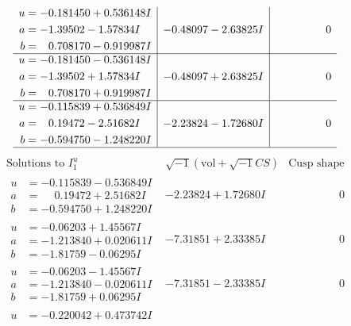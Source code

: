 \documentclass[1p]{elsarticle_modified}
\theoremstyle{definition}
\newcommand{\I}{\sqrt{-1}}
\begin{document}
$$\begin{array}{c|c|c}
\begin{aligned}
u &= -0.181450 + 0.536148 I \\
a &= -1.39502 - 1.57834 I \\
b &= \phantom{-}0.708170 - 0.919987 I\end{aligned}
 & -0.48097 - 2.63825 I & \phantom{-0.000000 } 0 \\ \hline\begin{aligned}
u &= -0.181450 - 0.536148 I \\
a &= -1.39502 + 1.57834 I \\
b &= \phantom{-}0.708170 + 0.919987 I\end{aligned}
 & -0.48097 + 2.63825 I & \phantom{-0.000000 } 0 \\ \hline\begin{aligned}
u &= -0.115839 + 0.536849 I \\
a &= \phantom{-}0.19472 - 2.51682 I \\
b &= -0.594750 - 1.248220 I\end{aligned}
 & -2.23824 - 1.72680 I & \phantom{-0.000000 } 0\\
 \hline 
 \end{array}$$\newpage$$\begin{array}{c|c|c}  
\text{Solutions to }I^u_{1}& \I (\text{vol} + \sqrt{-1}CS) & \text{Cusp shape}\\
 \hline 
\begin{aligned}
u &= -0.115839 - 0.536849 I \\
a &= \phantom{-}0.19472 + 2.51682 I \\
b &= -0.594750 + 1.248220 I\end{aligned}
 & -2.23824 + 1.72680 I & \phantom{-0.000000 } 0 \\ \hline\begin{aligned}
u &= -0.06203 + 1.45567 I \\
a &= -1.213840 + 0.020611 I \\
b &= -1.81759 - 0.06295 I\end{aligned}
 & -7.31851 + 2.33385 I & \phantom{-0.000000 } 0 \\ \hline\begin{aligned}
u &= -0.06203 - 1.45567 I \\
a &= -1.213840 - 0.020611 I \\
b &= -1.81759 + 0.06295 I\end{aligned}
 & -7.31851 - 2.33385 I & \phantom{-0.000000 } 0 \\ \hline\begin{aligned}
u &= -0.220042 + 0.473742 I \\

\end{aligned}
\end{array}$$
\end{document}
